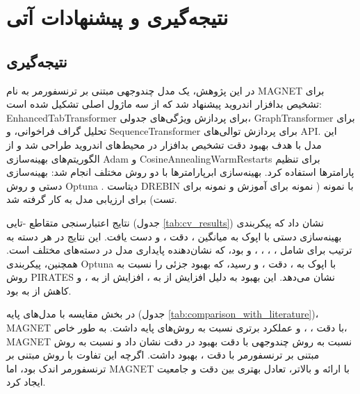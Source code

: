 \clearpage
\thispagestyle{empty}
\chapter{نتیجه‌گیری و پیشنهادات آتی}\label{chap6}

\section{نتیجه‌گیری}
در این پژوهش، یک مدل چندوجهی مبتنی بر ترنسفورمر به نام MAGNET برای تشخیص بدافزار اندروید پیشنهاد شد که از سه ماژول اصلی تشکیل شده است: EnhancedTabTransformer برای پردازش ویژگی‌های جدولی، GraphTransformer برای تحلیل گراف فراخوانی، و SequenceTransformer برای پردازش توالی‌های API. این مدل با هدف بهبود دقت تشخیص بدافزار در محیط‌های اندروید طراحی شد و از الگوریتم‌های بهینه‌سازی Adam و CosineAnnealingWarmRestarts برای تنظیم پارامترها استفاده کرد. بهینه‌سازی ابرپارامترها با دو روش مختلف انجام شد: بهینه‌سازی دستی و روش Optuna \cite{Optuna2019}. دیتاست DREBIN \cite{Drebin} با  نمونه ( نمونه برای آموزش و  نمونه برای تست) برای ارزیابی مدل به کار گرفته شد.

نتایج اعتبارسنجی متقاطع -تایی (جدول \ref{tab:cv_results}) نشان داد که پیکربندی بهینه‌سازی دستی با  اپوک به میانگین  ، دقت ، و   دست یافت. این نتایج در هر دسته به ترتیب برای  شامل ، ، ، ، و  بود، که نشان‌دهنده پایداری مدل در دسته‌های مختلف است. همچنین، پیکربندی Optuna با  اپوک به  ، دقت ، و   رسید، که بهبود جزئی را نسبت به روش PIRATES نشان می‌دهد. این بهبود به دلیل افزایش  از  به ، افزایش  از  به ، و کاهش  از  به  بود.

در بخش مقایسه با مدل‌های پایه (جدول \ref{tab:comparison_with_literature})، MAGNET با دقت ،  ، و   عملکرد برتری نسبت به روش‌های پایه داشت. به طور خاص، MAGNET نسبت به روش چندوجهی \cite{Alsaleh2023} با دقت  بهبود  در دقت نشان داد و نسبت به روش مبتنی بر ترنسفورمر \cite{TransformerMalware} با دقت ، بهبود  داشت. اگرچه این تفاوت با روش مبتنی بر ترنسفورمر اندک بود، اما MAGNET با ارائه  و  بالاتر، تعادل بهتری بین دقت و جامعیت ایجاد کرد.

